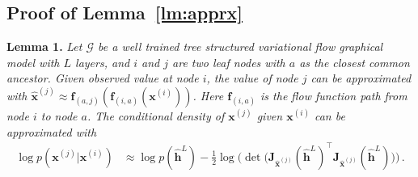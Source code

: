 \documentclass[twoside]{article}
\begin{document}
\subsection{Proof of Lemma~\ref{lm:apprx}}\label{appd:proof_lm1}
\textbf{Lemma 1.} {\it Let $\mathcal{G}$ be a well trained tree structured variational flow graphical model with $L$ layers, and $i$ and $j$ are two leaf nodes with $a$ as the closest common ancestor. 
Given observed value at node $i$, the value of node $j$ can be approximated with $\widehat{\mathbf{x}}^{(j)} \approx  \mathbf{f}_{(a,j)}(\mathbf{f}_{(i, a)}(\mathbf{x}^{(i)}))$. Here $\mathbf{f}_{(i, a)}$ is the flow function path from node $i$ to node $a$. 
The conditional density of $\mathbf{x}^{(j)}$ given $\mathbf{x}^{(i)}$ can be approximated with 
\begin{align*} %
\log p(\mathbf{x}^{(j)} | \mathbf{x}^{(i)}) &\approx  \log p(\widehat{\mathbf{h}}^L) -  \frac{1}{2} \log \big(\det \big(\mathbf{J}_{\widehat{\mathbf{x}}^{(j)}}(\widehat{\mathbf{h}}^L)^\top\mathbf{J}_{\widehat{\mathbf{x}}^{(j)}}(\widehat{\mathbf{h}}^L)\big) \big) \, .
\end{align*}
}
\end{document}
